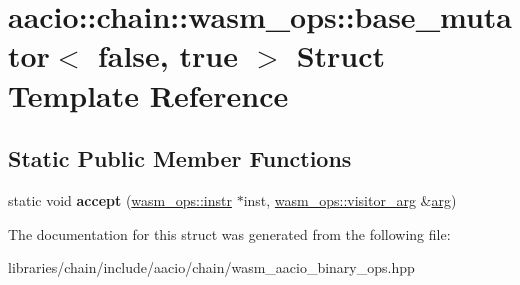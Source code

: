 \hypertarget{structaacio_1_1chain_1_1wasm__ops_1_1base__mutator_3_01false_00_01true_01_4}{}\section{aacio\+:\+:chain\+:\+:wasm\+\_\+ops\+:\+:base\+\_\+mutator$<$ false, true $>$ Struct Template Reference}
\label{structaacio_1_1chain_1_1wasm__ops_1_1base__mutator_3_01false_00_01true_01_4}
\subsection*{Static Public Member Functions}
\begin{DoxyCompactItemize}
\item 
\mbox{\label{structaacio_1_1chain_1_1wasm__ops_1_1base__mutator_3_01false_00_01true_01_4_a8f1410a7fabf06371aebe25392cff79a}} 
static void {\bfseries accept} (\mbox{\hyperlink{structaacio_1_1chain_1_1wasm__ops_1_1instr}{wasm\+\_\+ops\+::instr}} $\ast$inst, \mbox{\hyperlink{structaacio_1_1chain_1_1wasm__ops_1_1visitor__arg}{wasm\+\_\+ops\+::visitor\+\_\+arg}} \&\mbox{\hyperlink{unionarg}{arg}})
\end{DoxyCompactItemize}


The documentation for this struct was generated from the following file\+:\begin{DoxyCompactItemize}
\item 
libraries/chain/include/aacio/chain/wasm\+\_\+aacio\+\_\+binary\+\_\+ops.\+hpp\end{DoxyCompactItemize}

